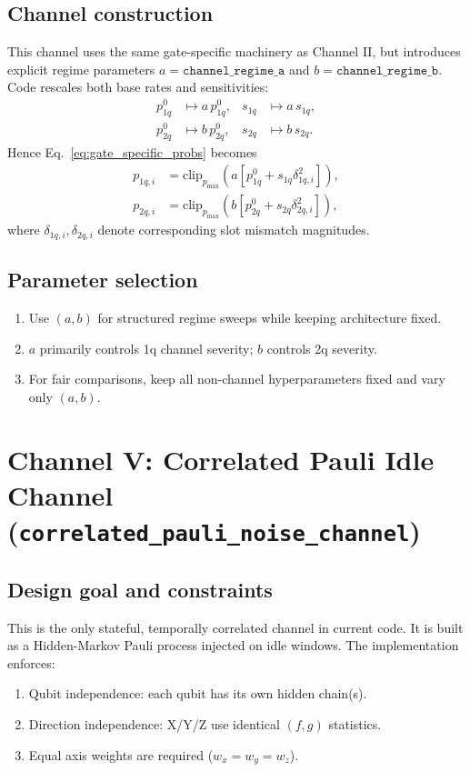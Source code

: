 \documentclass[11pt]{article}
\begin{document}
\subsection{Channel construction}
This channel uses the same gate-specific machinery as Channel II,
but introduces explicit regime parameters
$a=\texttt{channel\_regime\_a}$ and
$b=\texttt{channel\_regime\_b}$.
Code rescales both base rates and sensitivities:
\begin{align}
p_{1q}^{0}&\mapsto a\,p_{1q}^{0}, & s_{1q}&\mapsto a\,s_{1q},\\
p_{2q}^{0}&\mapsto b\,p_{2q}^{0}, & s_{2q}&\mapsto b\,s_{2q}.
\end{align}
Hence Eq.~\eqref{eq:gate_specific_probs} becomes
\begin{align}
p_{1q,i}&=\mathrm{clip}_{p_{\max}}\!\left(a\left[p_{1q}^{0}+s_{1q}\delta_{1q,i}^2\right]\right),\\
p_{2q,i}&=\mathrm{clip}_{p_{\max}}\!\left(b\left[p_{2q}^{0}+s_{2q}\delta_{2q,i}^2\right]\right),
\end{align}
where $\delta_{1q,i},\delta_{2q,i}$ denote corresponding slot mismatch magnitudes.

\subsection{Parameter selection}
\begin{enumerate}[label=\textbf{P\arabic*}.]
\item Use $(a,b)$ for structured regime sweeps while keeping architecture fixed.
\item $a$ primarily controls 1q channel severity; $b$ controls 2q severity.
\item For fair comparisons, keep all non-channel hyperparameters fixed and vary only $(a,b)$.
\end{enumerate}

\section{Channel V: Correlated Pauli Idle Channel (\texttt{correlated\_pauli\_noise\_channel})}

\subsection{Design goal and constraints}
This is the only stateful, temporally correlated channel in current code.
It is built as a Hidden-Markov Pauli process injected on idle windows.
The implementation enforces:
\begin{enumerate}[label=\textbf{C\arabic*}.]
\item Qubit independence: each qubit has its own hidden chain(s).
\item Direction independence: X/Y/Z use identical $(f,g)$ statistics.
\item Equal axis weights are required ($w_x=w_y=w_z$).
\end{enumerate}
\end{document}
